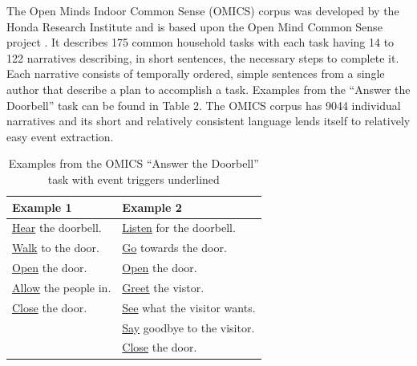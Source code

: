 \documentclass[letterpaper]{article}
\begin{document}
The Open Minds Indoor Common Sense (OMICS) corpus was developed by the Honda Research Institute and is based upon the Open Mind Common Sense project \cite{gupta2004common}. It describes 175 common household tasks with each task having 14 to 122 narratives describing, in short sentences, the necessary steps to complete it.  Each narrative consists of temporally ordered, simple sentences from a single author that describe a plan to accomplish a task.  Examples from the ``Answer the Doorbell'' task can be found in Table 2. The OMICS corpus has 9044 individual narratives and its short and relatively consistent language lends itself to relatively easy event extraction. %


\begin{table}
\footnotesize
\begin{center}
\begin{tabular}{| l | l |}
\hline
Example 1 & Example 2 \\
\hline
\underline{Hear} the doorbell. & \underline{Listen} for the doorbell. \\
\underline{Walk} to the door. & \underline{Go} towards the door. \\
\underline{Open} the door. & \underline{Open} the door. \\
\underline{Allow} the people in. & \underline{Greet} the vistor. \\
\underline{Close} the door. & \underline{See} what the visitor wants. \\
& \underline{Say} goodbye to the visitor. \\
& \underline{Close} the door. \\
\hline
\end{tabular}
\caption{Examples from the OMICS ``Answer the Doorbell'' task with event triggers underlined}
\end{center}
\label{table:omicsexample}
\end{table}
\end{document}
